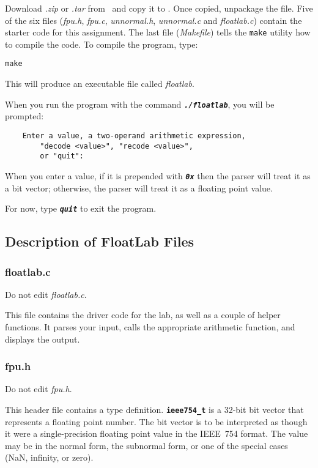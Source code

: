Download \textit{\shortlabname.zip} or \textit{\shortlabname.tar} from \filesource\ and copy it to \runtimeenvironment.
Once copied, unpackage the file.
Five of the six files (\textit{fpu.h}, \textit{fpu.c}, \textit{unnormal.h}, \textit{unnormal.c} and \textit{floatlab.c}) contain the starter code for this assignment.
The last file (\textit{Makefile}) tells the \texttt{make} utility how to compile the code.
To compile the program, type:

\texttt{make}

This will produce an executable file called \textit{floatlab}.

When you run the program with the command \texttt{\textbf{\textit{./floatlab}}}, you will be prompted:

\begin{verbatim}
    Enter a value, a two-operand arithmetic expression,
        "decode <value>", "recode <value>",
        or "quit":
\end{verbatim}

When you enter a value, if it is prepended with \texttt{\textbf{\textit{0x}}} then the parser will treat it as a bit vector;
otherwise, the parser will treat it as a floating point value.

For now, type \texttt{\textbf{\textit{quit}}} to exit the program.

\subsection{Description of FloatLab Files}

\subsubsection{floatlab.c}

Do not edit \textit{floatlab.c}.

This file contains the driver code for the lab, as well as a couple of helper functions.
It parses your input, calls the appropriate arithmetic function, and displays the output.

\subsubsection{fpu.h}\label{subsubsec:fpu.h}

Do not edit \textit{fpu.h}.

This header file contains a type definition.
\textbf{\texttt{ieee754\_t}} is a 32-bit bit vector that represents a floating point number.
The bit vector is to be interpreted as though it were a single-precision floating point value in the IEEE~754 format.
The value may be in the normal form, the subnormal form, or one of the special cases (NaN, infinity, or zero).

